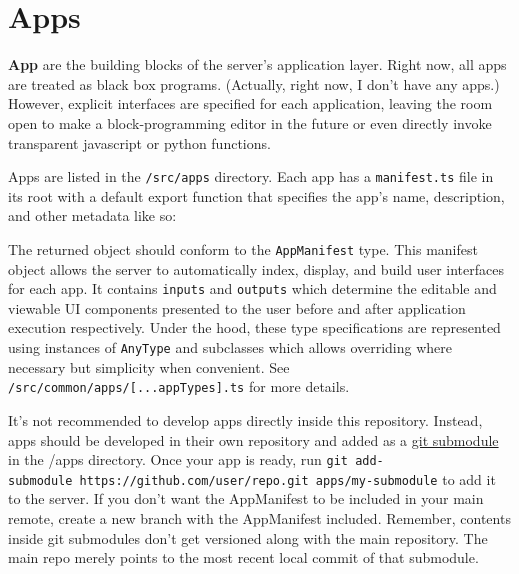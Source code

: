 \hypertarget{apps}{%
\section{Apps}\label{apps}}

\textbf{App} are the building blocks of the server's application layer.
Right now, all apps are treated as black box programs. (Actually, right
now, I don't have any apps.) However, explicit interfaces are specified
for each application, leaving the room open to make a block-programming
editor in the future or even directly invoke transparent javascript or
python functions.

Apps are listed in the \texttt{/src/apps} directory. Each app has a
\texttt{manifest.ts} file in its root with a default export function
that specifies the app's name, description, and other metadata like so:

\begin{Shaded}
\begin{Highlighting}[]
 \NormalTok{ ()}\OperatorTok{:}\KeywordTok{=>} \OperatorTok{\{}
    \OperatorTok{\{}
\OperatorTok{:} \OperatorTok{,}
\OperatorTok{:} \OperatorTok{,}
  \OperatorTok{\}}
\OperatorTok{\}}
\end{Highlighting}
\end{Shaded}

The returned object should conform to the \texttt{AppManifest} type.
This manifest object allows the server to automatically index, display,
and build user interfaces for each app. It contains \texttt{inputs} and
\texttt{outputs} which determine the editable and viewable UI components
presented to the user before and after application execution
respectively. Under the hood, these type specifications are represented
using instances of \texttt{AnyType} and subclasses which allows
overriding where necessary but simplicity when convenient. See
\texttt{/src/common/apps/{[}...appTypes{]}.ts} for more details.

It's not recommended to develop apps directly inside this repository.
Instead, apps should be developed in their own repository and added as a
\href{https://git-scm.com/book/en/v2/Git-Tools-Submodules}{git
submodule} in the /apps directory. Once your app is ready, run
\texttt{git\ add-submodule\ https://github.com/user/repo.git\ apps/my-submodule}
to add it to the server. If you don't want the AppManifest to be
included in your main remote, create a new branch with the AppManifest
included. Remember, contents inside git submodules don't get versioned
along with the main repository. The main repo merely points to the most
recent local commit of that submodule.

